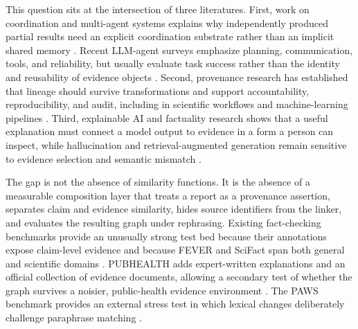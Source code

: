 \documentclass{ieeeaccess}
\begin{document}
This question sits at the intersection of three literatures. First, work on coordination and multi-agent systems explains why independently produced partial results need an explicit coordination substrate rather than an implicit shared memory \cite{Anont4666174668,Anonm202109996w,Anona8023096336,Anonat201801002}. Recent LLM-agent surveys emphasize planning, communication, tools, and reliability, but usually evaluate task success rather than the identity and reusability of evidence objects \cite{Anona6024000092,Anona6024000092,Anona6023067920}. Second, provenance research has established that lineage should survive transformations and support accountability, reproducibility, and audit, including in scientific workflows and machine-learning pipelines \cite{Anonpdinta00119,Anond1453593294,Anond0182887201,Anonrone0309210,Anonw002cpe6544,Anont15ea000136,Anoni5901717470,Anont2017704893,Anontticsbth361,Anong2010118r86}. Third, explainable AI and factuality research shows that a useful explanation must connect a model output to evidence in a form a person can inspect, while hallucination and retrieval-augmented generation remain sensitive to evidence selection and semantic mismatch \cite{Anone1453561048,Anones201912012,Anona0203027314,Anonet201807007,Anoni9023101798,Anona1453236009,Anond6024074210,Anonl6023062912,Anonf602400881z}.

The gap is not the absence of similarity functions. It is the absence of a measurable composition layer that treats a report as a provenance assertion, separates claim and evidence similarity, hides source identifiers from the linker, and evaluates the resulting graph under rephrasing. Existing fact-checking benchmarks provide an unusually strong test bed because their annotations expose claim-level evidence and because FEVER and SciFact span both general and scientific domains \cite{thorne2018fever,won2020scifact}. PUBHEALTH adds expert-written explanations and an official collection of evidence documents, allowing a secondary test of whether the graph survives a noisier, public-health evidence environment \cite{kotonya2020pubhealth}. The PAWS benchmark provides an external stress test in which lexical changes deliberately challenge paraphrase matching \cite{zhang2019paws}.
\end{document}
